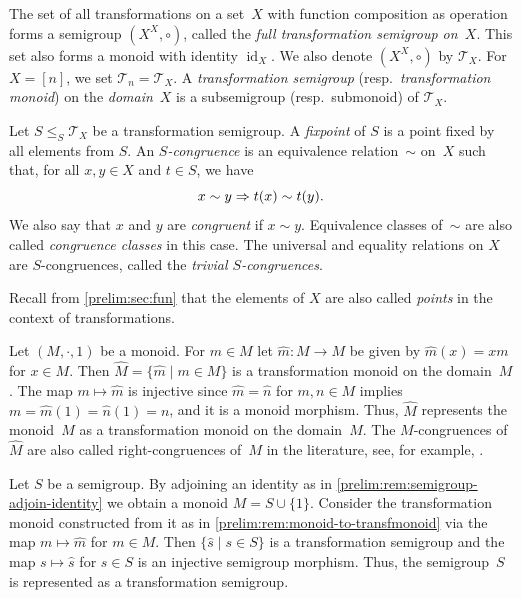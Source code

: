 
\label{def:T_X}
\label{def:T_n}
The set of all transformations on a set~$X$
with function composition as operation forms
a semigroup $(X^X, \circ)$, called
the \emph{full transformation semigroup on~$X$}.
This set also forms a monoid with identity $\operatorname{id}_X$.
We also denote $(X^X, \circ)$ by $\mathcal T_X$.
For $X = [n]$, we set $\mathcal T_n = \mathcal T_X$. 
A \emph{transformation semigroup} (resp.~\emph{transformation monoid}) on the \emph{domain}~$X$ 
is a subsemigroup (resp.~submonoid) of $\mathcal T_X$.

Let $S \le_S \mathcal T_X$ be a transformation semigroup. 
A \emph{fixpoint} of $S$ is a point fixed by all elements from $S$. 
An \emph{$S$-congruence} is an equivalence relation~$\sim$ on~$X$ such that,
for all $x,y \in X$ and $t \in S$, we have 
\begin{equation}
	\label{prelim:trans_semigrp_congruence} 
	x \sim y \Rightarrow \applyfunc{x}{t} \sim \applyfunc{y}{t}.
\end{equation} 
We also say that $x$ and $y$ are \emph{congruent} if $x \sim y$. Equivalence classes of~$\sim$
are also called \emph{congruence classes} in this case.
The universal and equality relations on $X$ are $S$-congruences, called the \emph{trivial $S$-congruences}. 

Recall from \cref{prelim:sec:fun} that the elements of $X$ are also called \emph{points} in the context
of transformations.

\begin{remark} \label{prelim:rem:monoid-to-transfmonoid}
	Let $(M, \cdot, 1)$ be a monoid.
	For $m \in M$ let $\hat{m} \colon M \to M$
	be given by $\hat{m}(x) = xm$ for $x \in M$.
	Then $\hat{M} = \{ \hat{m} \mid m \in M \}$ is a transformation monoid
	on the domain~$M$.
	The map  $m \mapsto \hat{m}$
	is injective
	since $\hat{m} = \hat{n}$ for $m,n \in M$ 
	implies $m = \hat{m}(1) = \hat{n}(1) = n$,
	and it is a monoid morphism.
	Thus, $\hat{M}$ represents the monoid~$M$
	as a transformation monoid on the domain~$M$.
	The $M$-congruences of $\hat{M}$ are also called
	right-congruences of~$M$ in the literature, see, for example, \cite{howie1995fundamentals}.
\end{remark}

\begin{remark} \label{prelim:rem:semigrp-to-transfsemigrp}
	Let $S$ be a semigroup.
	By adjoining an identity as in \cref{prelim:rem:semigroup-adjoin-identity} 	
	we obtain a monoid $M = S \cup \{1\}$.
	Consider the transformation monoid
	constructed from it as in \cref{prelim:rem:monoid-to-transfmonoid}
	via the map $m \mapsto \hat{m}$ for $m \in M$.
	Then $\{ \hat{s} \mid s \in S\}$
	is a transformation semigroup and the map $s \mapsto \hat{s}$ for $s \in S$
	is an injective semigroup morphism.
	Thus, the semigroup~$S$ is represented as a transformation semigroup.
\end{remark}

